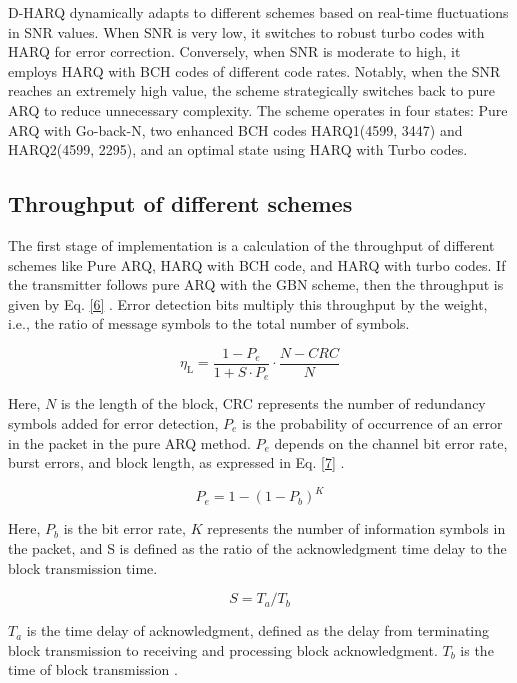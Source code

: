 \documentclass[sn-mathphys-num]{sn-jnl}
\theoremstyle{thmstyleone}
\theoremstyle{thmstyletwo}%
\theoremstyle{thmstylethree}%
\begin{document}
D-HARQ dynamically adapts to different schemes based on real-time fluctuations in SNR values. When SNR is very low, it switches to robust turbo codes with HARQ for error correction. Conversely, when SNR is moderate to high, it employs  HARQ with BCH codes of different code rates. Notably, when the SNR reaches an extremely high value, the scheme strategically switches back to pure ARQ to reduce unnecessary complexity. The scheme operates in four states:  Pure ARQ with Go-back-N, two enhanced BCH codes HARQ1(4599, 3447) and HARQ2(4599, 2295), and an optimal state using HARQ with Turbo codes.

\subsection{Throughput of different schemes} \label{s3.2}

The first stage of implementation is a calculation of the throughput of different schemes like Pure ARQ, HARQ with BCH code, and HARQ with turbo codes. If the transmitter follows pure ARQ with the GBN scheme, then the throughput is given by Eq. \ref{6} \cite{r8}. Error detection bits multiply this throughput by the weight, i.e., the ratio of message symbols to the total number of symbols.

\begin{equation}\label{6} 
    \eta_{\text{L}} = \frac{1 - P_e}{1 + S \cdot P_e} \cdot \frac{N - CRC}{N} 
\end{equation} 

Here, $N$ is the length of the block, CRC represents the number of redundancy symbols added for error detection, ${P}_e$ is the probability of occurrence of an error in the packet in the pure ARQ method. ${P}_e$ depends on the channel bit error rate, burst errors, and block length, as expressed in Eq. \ref{7} \cite{r5}.
 
\begin{equation}\label{7} 
    P_e = 1 - (1 - P_b)^K
\end{equation}

Here, ${P}_b$ is the bit error rate, $K$ represents the number of information symbols in the packet, and S is defined as the ratio of the acknowledgment time delay to the block transmission time.

\begin{equation}\label{8}
     S = T_a / T_b
\end{equation}

${T}_a$ is the time delay of acknowledgment, defined as the delay from terminating block transmission to receiving and processing block acknowledgment. ${T}_b$ is the time of block transmission \cite{r21}.
\end{document}
